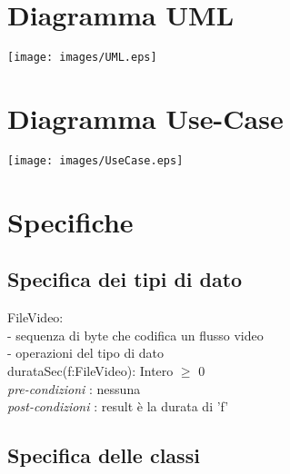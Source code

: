 \documentclass[12pt, letterpaper]{article}
\newcommand{\id}{{\hphantom{ident}}}
\begin{document}
\section{Diagramma UML}\begin{center}
    \texttt{[image: images/UML.eps]}
\end{center}
\newpage
\section{Diagramma Use-Case}\begin{center}
    \texttt{[image: images/UseCase.eps]}
\end{center}
\newpage
\section{Specifiche}
\subsection{Specifica dei tipi di dato}
FileVideo:      \\
\id- sequenza di byte che codifica un flusso video \\
\id- operazioni del tipo di dato      \\
\id durataSec(f:FileVideo): Intero $\ge$ 0\\
\id \id \textit{pre-condizioni} :  nessuna\\
\id \id \textit{post-condizioni} : result è la durata di 'f'
\subsection{Specifica delle classi}
\end{document}
